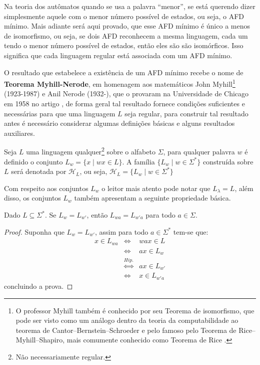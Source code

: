 Na teoria dos autômatos quando se usa a palavra ``menor'', se está querendo dizer simplesmente aquele com o menor número possível de estados, ou seja, o AFD mínimo.  Mais adiante será aqui provado, que esse AFD mínimo é único a menos de isomorfismo, ou seja, se dois AFD reconhecem a mesma linguagem, cada um tendo o menor número possível de estados, então eles são são isomórficos. Isso significa que cada linguagem regular está associada com um AFD mínimo. 

O resultado que estabelece a existência de um AFD mínimo recebe o nome de \textbf{Teorema Myhill-Nerode}, em homenagem aos matemáticos John Myhill\footnote{O professor Myhill também é conhecido por seu Teorema de isomorfismo\cite{myhill1957-isomorfismo}, que pode ser visto como um análogo dentro da teoria da computabilidade ao teorema de Cantor–Bernstein–Schroeder e pelo famoso pelo Teorema  de Rice–Myhill–Shapiro, mais comumente conhecido como Teorema de Rice \cite{benjaLivro2010, rice1953-teorema-Rice}.} (1923-1987) e Anil Nerode (1932-), que o provaram na Universidade de Chicago em 1958 no artigo \cite{nerode1958}, de forma geral tal resultado fornece condições suficientes e necessárias para que uma linguagem $L$ seja regular, para construir tal resultado antes é necessário considerar algumas definições básicas e alguns resultados auxiliares.

\begin{definition}\label{def:FamiliaH-L}
	Seja $L$ uma linguagem qualquer\footnote{Não necessariamente regular.} sobre o alfabeto $\Sigma$, para qualquer palavra $w$ é definido o conjunto $L_w = \{x \mid wx \in L\}$. A família $\{L_w \mid w \in \Sigma^*\}$ construída sobre $L$ será denotada por $\mathcal{H}_L$, ou seja, $\mathcal{H}_L = \{L_w \mid w \in \Sigma^*\}$
\end{definition}

Com respeito aos conjuntos $L_w$ o leitor mais atento pode notar que $L_\lambda = L$, além disso,  os conjuntos $L_w$ também apresentam a seguinte propriedade básica.

\begin{proposition}
	Dado $L \subseteq \Sigma^*$. Se $L_w = L_{w'}$, então $L_{wa} = L_{w'a}$ para todo $a \in \Sigma$.
\end{proposition}

\begin{proof}
	Suponha que $L_w = L_{w'}$, assim para todo $a \in \Sigma^*$ tem-se que:
	\begin{eqnarray*}
		x \in L_{wa} &\Longleftrightarrow & wax \in L\\
		& \Longleftrightarrow  & ax \in L_w\\
		& \stackrel{Hip.}{\Longleftrightarrow} & ax \in L_{w'}\\
		& \Longleftrightarrow  & x \in L_{w'a}
	\end{eqnarray*}
	concluindo a prova.
\end{proof}

